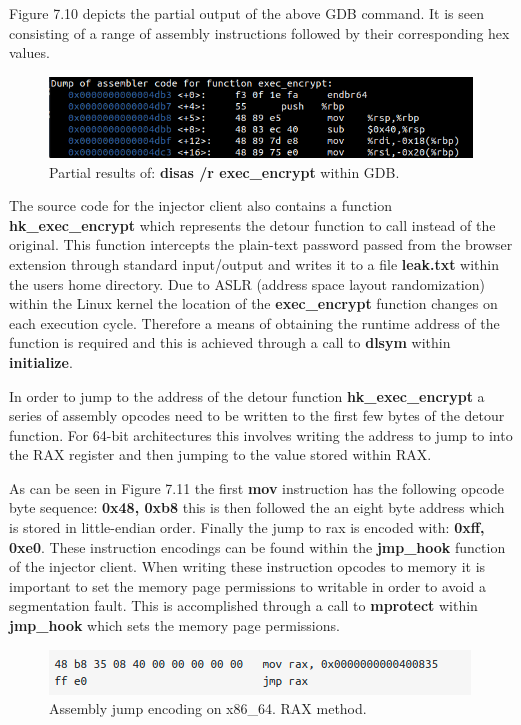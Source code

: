 Figure 7.10 depicts the partial output of the above GDB command. It is seen consisting of a range of assembly instructions followed by their corresponding hex values.
\begin{figure}[H]
\centering
\includegraphics[width=1\columnwidth]{Figures/Fig_37.png}
\caption{Partial results of: \textbf{disas /r exec\_encrypt} within GDB.}
\label{fig:gantt}
\end{figure}

The source code for the injector client also contains a function \textbf{hk\_exec\_encrypt} which represents the detour function to call instead of the original. This function intercepts the plain-text password passed from the browser extension through standard input/output and writes it to a file \textbf{leak.txt} within the users home directory. Due to ASLR (address space layout randomization) within the Linux kernel the location of the \textbf{exec\_encrypt} function changes on each execution cycle. Therefore a means of obtaining the runtime address of the function is required and this is achieved through a call to \textbf{dlsym} within \textbf{initialize}.

In order to jump to the address of the detour function \textbf{hk\_exec\_encrypt} a series of assembly opcodes need to be written to the first few bytes of the detour function. For 64-bit architectures this involves writing the address to jump to into the RAX register and then jumping to the value stored within RAX.

As can be seen in Figure 7.11 the first \textbf{mov} instruction has the following opcode byte sequence: \textbf{0x48, 0xb8} this is then followed the an eight byte address which is stored in little-endian order. Finally the jump to rax is encoded with: \textbf{0xff, 0xe0}. These instruction encodings can be found within the \textbf{jmp\_hook} function of the injector client. When writing these instruction opcodes to memory it is important to set the memory page permissions to writable in order to avoid a segmentation fault. This is accomplished through a call to \textbf{mprotect} within \textbf{jmp\_hook} which sets the memory page permissions. 

\begin{figure}[H]
\centering
\includegraphics[width=0.8\columnwidth]{Figures/Fig_38.png}
\caption{Assembly jump encoding on x86\_64. RAX method.}
\label{fig:gantt}
\end{figure}

